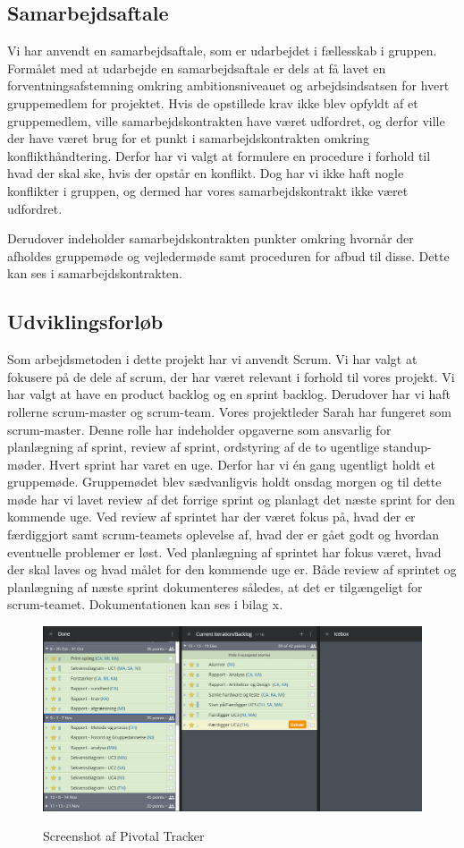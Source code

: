\subsection{Samarbejdsaftale}
Vi har anvendt en samarbejdsaftale, som er udarbejdet i fællesskab i gruppen. Formålet med at udarbejde en samarbejdsaftale er dels at få lavet en forventningsafstemning omkring ambitionsniveauet og arbejdsindsatsen for hvert gruppemedlem for projektet. Hvis de opstillede krav ikke blev opfyldt af et gruppemedlem, ville samarbejdskontrakten have været udfordret, og derfor ville der have været brug for et punkt i samarbejdskontrakten omkring konflikthåndtering. Derfor har vi valgt at formulere en procedure i forhold til hvad der skal ske, hvis der opstår en konflikt. Dog har vi ikke haft nogle konflikter i gruppen, og dermed har vores samarbejdskontrakt ikke været udfordret. 

Derudover indeholder samarbejdskontrakten punkter omkring hvornår der afholdes gruppemøde og vejledermøde samt proceduren for afbud til disse. Dette kan ses i samarbejdskontrakten. 


\subsection{Udviklingsforløb}
Som arbejdsmetoden i dette projekt har vi anvendt Scrum. Vi har valgt at fokusere på de dele af scrum, der har været relevant i forhold til vores projekt. Vi har valgt at have en product backlog og en sprint backlog. Derudover har vi haft rollerne scrum-master og scrum-team. Vores projektleder Sarah har fungeret som scrum-master. Denne rolle har indeholder opgaverne som ansvarlig for planlægning af sprint, review af sprint, ordstyring af de to ugentlige standup-møder. Hvert sprint har varet en uge. Derfor har vi én gang ugentligt holdt et gruppemøde. Gruppemødet blev sædvanligvis holdt onsdag morgen og til dette møde har vi lavet review af det forrige sprint og planlagt det næste sprint for den kommende uge. Ved review af sprintet har der været fokus på, hvad der er færdiggjort samt scrum-teamets oplevelse af, hvad der er gået godt og hvordan eventuelle problemer er løst. Ved planlægning af sprintet har fokus været, hvad der skal laves og hvad målet for den kommende uge er. Både review af sprintet og planlægning af næste sprint dokumenteres således, at det er tilgængeligt for scrum-teamet. Dokumentationen kan ses i bilag x.

	\begin{figure}[h!]
	\centering
	\includegraphics[width=0.9\linewidth]{Udviklingsproces/Metode/PivotalTracker}
	\label{fig:pivotal}
	\caption{Screenshot af Pivotal Tracker}
\end{figure}

